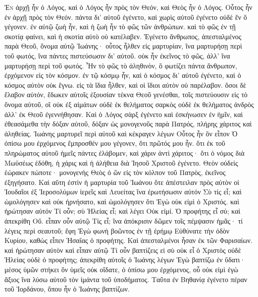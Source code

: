 \begin{pages}
    \begin{Rightside}
        \beginnumbering
		\renewcommand{\LettrineFontHook}{\PHtitl}
		\lettrine[lines=3]{Ἐ}{ν} ἀρχῇ ἦν ὁ Λόγος, καὶ ὁ Λόγος ἦν πρὸς τὸν Θεόν, καὶ Θεὸς ἦν ὁ Λόγος. Οὗτος ἦν ἐν ἀρχῇ πρὸς τὸν Θεόν. πάντα δι’ αὐτοῦ ἐγένετο, καὶ χωρὶς αὐτοῦ ἐγένετο οὐδὲ ἕν ὃ γέγονεν. ἐν αὐτῷ ζωὴ ἦν, καὶ ἡ ζωὴ ἦν τὸ φῶς τῶν ἀνθρώπων. καὶ τὸ φῶς ἐν τῇ σκοτίᾳ φαίνει, καὶ ἡ σκοτία αὐτὸ οὐ κατέλαβεν. 
		\pend
		\pstart		
		Ἐγένετο ἄνθρωπος, ἀπεσταλμένος παρὰ Θεοῦ, ὄνομα αὐτῷ Ἰωάνης· οὗτος ἦλθεν εἰς μαρτυρίαν, ἵνα μαρτυρήσῃ περὶ τοῦ φωτός, ἵνα πάντες πιστεύσωσιν δι’ αὐτοῦ. οὐκ ἦν ἐκεῖνος τὸ φῶς, ἀλλ’ ἵνα μαρτυρήσῃ περὶ τοῦ φωτός. Ἦν τὸ φῶς τὸ ἀληθινὸν, ὃ φωτίζει πάντα ἄνθρωπον, ἐρχόμενον εἰς τὸν κόσμον. ἐν τῷ κόσμῳ ἦν, καὶ ὁ κόσμος δι’ αὐτοῦ ἐγένετο, καὶ ὁ κόσμος αὐτὸν οὐκ ἔγνω. εἰς τὰ ἴδια ἦλθεν, καὶ οἱ ἴδιοι αὐτὸν οὐ παρέλαβον. ὅσοι δὲ ἔλαβον αὐτόν, ἔδωκεν αὐτοῖς ἐξουσίαν τέκνα Θεοῦ γενέσθαι, τοῖς πιστεύουσιν εἰς τὸ ὄνομα αὐτοῦ, οἳ οὐκ ἐξ αἱμάτων οὐδὲ ἐκ θελήματος σαρκὸς οὐδὲ ἐκ θελήματος ἀνδρὸς ἀλλ’ ἐκ Θεοῦ ἐγεννήθησαν. 
		\pend
		\pstart
		Καὶ ὁ Λόγος σὰρξ ἐγένετο καὶ ἐσκήνωσεν ἐν ἡμῖν, καὶ ἐθεασάμεθα τὴν δόξαν αὐτοῦ, δόξαν ὡς μονογενοῦς παρὰ Πατρός, πλήρης χάριτος καὶ ἀληθείας. Ἰωάνης μαρτυρεῖ περὶ αὐτοῦ καὶ κέκραγεν λέγων Οὗτος ἦν ὃν εἶπον Ὁ ὀπίσω μου ἐρχόμενος ἔμπροσθέν μου γέγονεν, ὅτι πρῶτός μου ἦν. ὅτι ἐκ τοῦ πληρώματος αὐτοῦ ἡμεῖς πάντες ἐλάβομεν, καὶ χάριν ἀντὶ χάριτος· ὅτι ὁ νόμος διὰ Μωϋσέως ἐδόθη, ἡ χάρις καὶ ἡ ἀλήθεια διὰ Ἰησοῦ Χριστοῦ ἐγένετο. Θεὸν οὐδεὶς ἑώρακεν πώποτε· μονογενὴς Θεὸς ὁ ὢν εἰς τὸν κόλπον τοῦ Πατρὸς, ἐκεῖνος ἐξηγήσατο.
		\pend
		\pstart
		Καὶ αὕτη ἐστὶν ἡ μαρτυρία τοῦ Ἰωάνου ὅτε ἀπέστειλαν πρὸς αὐτὸν οἱ Ἰουδαῖοι ἐξ Ἱεροσολύμων ἱερεῖς καὶ Λευείτας ἵνα ἐρωτήσωσιν αὐτόν Σὺ τίς εἶ; καὶ ὡμολόγησεν καὶ οὐκ ἠρνήσατο, καὶ ὡμολόγησεν ὅτι Ἐγὼ οὐκ εἰμὶ ὁ Χριστός. καὶ ἠρώτησαν αὐτόν Τί οὖν; σὺ Ἡλείας εἶ; καὶ λέγει Οὐκ εἰμί. Ὁ προφήτης εἶ σύ; καὶ ἀπεκρίθη Οὔ. εἶπαν οὖν αὐτῷ Τίς εἶ; ἵνα ἀπόκρισιν δῶμεν τοῖς πέμψασιν ἡμᾶς· τί λέγεις περὶ σεαυτοῦ; ἔφη Ἐγὼ φωνὴ βοῶντος ἐν τῇ ἐρήμῳ Εὐθύνατε τὴν ὁδὸν Κυρίου, καθὼς εἶπεν Ἡσαΐας ὁ προφήτης. 
		\pend
		\pstart
		Καὶ ἀπεσταλμένοι ἦσαν ἐκ τῶν Φαρισαίων. καὶ ἠρώτησαν αὐτὸν καὶ εἶπαν αὐτῷ Τί οὖν βαπτίζεις εἰ σὺ οὐκ εἶ ὁ Χριστὸς οὐδὲ Ἡλείας οὐδὲ ὁ προφήτης; ἀπεκρίθη αὐτοῖς ὁ Ἰωάνης λέγων Ἐγὼ βαπτίζω ἐν ὕδατι· μέσος ὑμῶν στήκει ὃν ὑμεῖς οὐκ οἴδατε, ὁ ὀπίσω μου ἐρχόμενος, οὗ οὐκ εἰμὶ ἐγὼ ἄξιος ἵνα λύσω αὐτοῦ τὸν ἱμάντα τοῦ ὑποδήματος. Ταῦτα ἐν Βηθανίᾳ ἐγένετο πέραν τοῦ Ἰορδάνου, ὅπου ἦν ὁ Ἰωάνης βαπτίζων.

\end{Rightside}
\end{pages}
